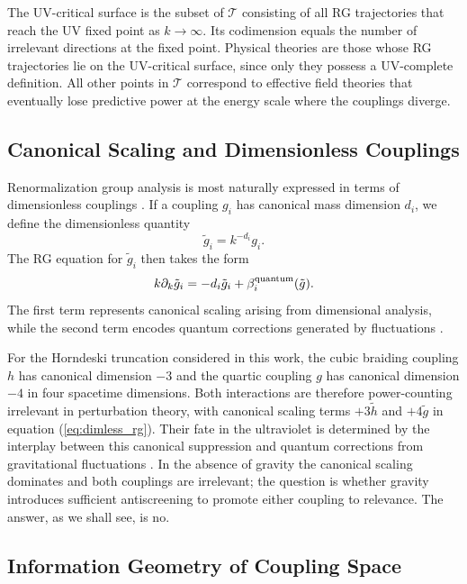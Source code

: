 \documentclass[12pt,a4paper]{article}
\begin{document}
The UV-critical surface is the subset of $\mathcal{T}$ consisting of all
RG trajectories that reach the UV fixed point as $k \to \infty$. Its
codimension equals the number of irrelevant directions at the fixed point.
Physical theories are those whose RG trajectories lie on the UV-critical
surface, since only they possess a UV-complete definition. All other points
in $\mathcal{T}$ correspond to effective field theories that eventually lose
predictive power at the energy scale where the couplings diverge.

\subsection{Canonical Scaling and Dimensionless Couplings}

Renormalization group analysis is most naturally expressed in terms of
dimensionless couplings \cite{Peskin1995,Weinberg1995,ZinnJustin2002}.
If a coupling $g_i$ has canonical mass dimension $d_i$, we define the
dimensionless quantity
\begin{equation}
\tilde g_i = k^{-d_i} g_i.
\end{equation}
The RG equation for $\tilde g_i$ then takes the form
\begin{equation}
k\partial_k \tilde g_i = -d_i \tilde g_i + \beta_i^{\rm quantum}(\tilde g).
\label{eq:dimless_rg}
\end{equation}
The first term represents canonical scaling arising from dimensional analysis,
while the second term encodes quantum corrections generated by fluctuations
\cite{Berges2002,Dupuis2021}.

For the Horndeski truncation considered in this work, the cubic braiding
coupling $h$ has canonical dimension $-3$ and the quartic coupling $g$ has
canonical dimension $-4$ in four spacetime dimensions. Both interactions are
therefore power-counting irrelevant in perturbation theory, with canonical
scaling terms $+3\tilde h$ and $+4\tilde g$ in equation (\ref{eq:dimless_rg}).
Their fate in the ultraviolet is determined by the interplay between this
canonical suppression and quantum corrections from gravitational fluctuations
\cite{EichhornLinoWagner2023}. In the absence of gravity the canonical scaling
dominates and both couplings are irrelevant; the question is whether gravity
introduces sufficient antiscreening to promote either coupling to relevance.
The answer, as we shall see, is no.

\subsection{Information Geometry of Coupling Space}
\end{document}
